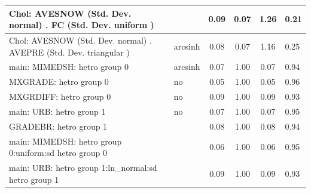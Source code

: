 \begin{table}
\begin{center}
\begin{tabular}{|l|l|c|c|c|l|}
			\hline
			 Chol: AVESNOW (Std. Dev. normal) . FC (Std. Dev.   uniform ) &  & 0.09 & 0.07 & 1.26 & 0.21 \\
			\hline
			 Chol: AVESNOW (Std. Dev. normal) . AVEPRE (Std. Dev.   triangular ) & arcsinh & 0.08 & 0.07 & 1.16 & 0.25 \\
			\hline
			main: MIMEDSH: hetro group 0 & arcsinh & 0.07 & 1.00 & 0.07 & 0.94 \\
			\hline
			MXGRADE: hetro group 0 & no & 0.05 & 1.00 & 0.05 & 0.96 \\
			\hline
			MXGRDIFF: hetro group 0 & no & 0.09 & 1.00 & 0.09 & 0.93 \\
			\hline
			main: URB: hetro group 1 & no & 0.07 & 1.00 & 0.07 & 0.95 \\
			\hline
			GRADEBR: hetro group 1 &  & 0.08 & 1.00 & 0.08 & 0.94 \\
			\hline
			main: MIMEDSH: hetro group 0:uniform:sd  hetro group 0 &  & 0.06 & 1.00 & 0.06 & 0.95 \\
			\hline
			main: URB: hetro group 1:ln_normal:sd  hetro group 1 &  & 0.09 & 1.00 & 0.09 & 0.93 \\
			\hline
		\end{tabular}
	\end{center}
\end{table}